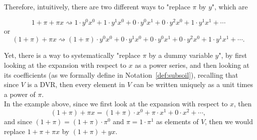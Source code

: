 \documentclass{article}
\numberwithin{theorem}{section}
\begin{document}
\noindent Therefore, intuitively,  there are two different ways to "replace $\pi$ by $y$", which are 
%
\begin{center}
  \vspace{-10mm}
\begin{equation*}
    1+\pi + \pi x  \rightsquigarrow 1\cdot y^0x^0 + 1 \cdot y^1 x^0 + 0 \cdot y^0x^1 + 0 \cdot y^2x^0 + 1\cdot y^1 x^1 + \cdots 
\end{equation*}
    or
    \begin{equation*}
   (1+\pi) + \pi x  \rightsquigarrow (1+\pi)\cdot y^0x^0 + 0 \cdot y^1 x^0 + 0 \cdot y^0x^1 + 0 \cdot y^2x^0 + 1\cdot y^1 x^1+ \cdots.
\end{equation*}
\end{center}
%
\noindent Yet, there is a way to systematically "replace $\pi$ by a dummy variable $y$", by first looking at the expansion with respect to $x$ as a power series, and then looking at its coefficients (as we formally define in Notation~\ref{def:subsoil}), recalling that since $V$ is a DVR, then every element in $V$ can be written uniquely as a unit times a power of $\pi$.\\

In the example above,  since we first look at the expansion with respect to $x$, then 
%
\begin{equation*}
    (1+\pi) + \pi x = (1+\pi)\cdot x^0 + \pi \cdot x^1 + 0 \cdot x^2 + \cdots, 
\end{equation*}
%
 and since $(1+\pi)=(1+\pi) \cdot \pi^0$ and $\pi = 1 \cdot \pi^1$ as elements of $V$, then we would replace $1+\pi + \pi x$ by $(1+\pi) + y x$.\\
\end{document}
